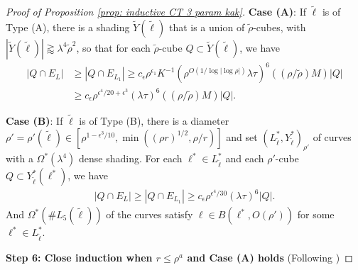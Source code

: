 \documentclass[12pt]{amsart}
\numberwithin{equation}{section}
\newcommand{\1}{\mathbbm{1}}
\begin{document}
\begin{proof}[Proof of Proposition \ref{prop: inductive CT 3 param kak}]
    \noindent \textbf{Case (A)}: If $\tilde \ell$ is of Type (A), there is a shading $\tilde Y(\tilde \ell)$ that is a union of $\tilde \rho$-cubes, with $|\tilde Y(\tilde \ell)| \gtrapprox \lambda^4 {\tilde \rho}^2$, so that for each $\tilde \rho$-cube $Q \subset \tilde Y(\tilde \ell)$, we have 
    \begin{align} \label{eq: case (A)}
        |Q \cap E_L| &\geq |Q \cap E_{L_1}| \geq c_\epsilon \rho^{\epsilon_1}  K^{-1} (\rho^{O(1/\log|\log \rho|)} \lambda \tau)^6 ((\rho / \tilde \rho) M) |Q| \\
        &\geq c_{\epsilon} \rho^{\epsilon^4/20 + \epsilon^3} (\lambda \tau)^6 ((\rho / \tilde \rho) M) |Q|.
    \end{align}
    

    \noindent \textbf{Case (B)}: If $\tilde \ell$ is of Type (B), there is a diameter $\rho' = \rho'(\tilde \ell) \in [\rho^{1-\epsilon^3/10}, \min((\rho r)^{1/2}, \rho/r)]$ 
    and set $(L^*_{\tilde \ell}, Y_{\tilde \ell}^*)_{\rho'}$ of curves with a $\Omega^*(\lambda^4)$ dense shading. For each $\ell^* \in L_{\tilde \ell}^*$ and each $\rho'$-cube $Q \subset Y_{\tilde \ell}^*(\ell^*)$, we have
    \begin{align}
        |Q \cap E_L| \geq |Q \cap E_{L_1}| \geq c_{\epsilon} \rho^{\epsilon^4/30}  (\lambda \tau)^6 |Q|. 
    \end{align}
    And $\Omega^*(\#L_5(\tilde \ell))$ of the curves satisfy $\ell \in B(\ell^*, O(\rho'))$ for some $\ell^* \in L_{\tilde \ell}^*$. 

    \medskip

    \noindent \textbf{Step 6: Close induction when $r \leq \rho^a$ and Case (A) holds} (Following \cite[Step 6 pg. 18]{KWZ})


\end{proof}
\end{document}
